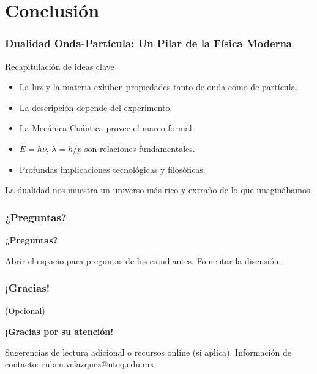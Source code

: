 \documentclass{beamer}
\begin{document}
	\section{Conclusión}
	
	\begin{frame}
		\frametitle{Dualidad Onda-Partícula: Un Pilar de la Física Moderna}
		\begin{block}{Recapitulación de ideas clave}
			\begin{itemize}
				\item La luz y la materia exhiben propiedades tanto de onda como de partícula.
				\item La descripción depende del experimento.
				\item La Mecánica Cuántica provee el marco formal.
				\item $E=h\nu$, $\lambda=h/p$ son relaciones fundamentales.
				\item Profundas implicaciones tecnológicas y filosóficas.
			\end{itemize}
		\end{block}
		\pause
		La dualidad nos muestra un universo más rico y extraño de lo que imaginábamos.
	\end{frame}
	
	\begin{frame}
		\frametitle{¿Preguntas?}
		\begin{center}
			\Huge \textbf{¿Preguntas?}
		\end{center}
		\vfill
		Abrir el espacio para preguntas de los estudiantes.
		\newline
		Fomentar la discusión.
	\end{frame}
	
	\begin{frame}
		\frametitle{¡Gracias!}
		(Opcional)
		\begin{center}
			\Huge \textbf{¡Gracias por su atención!}
		\end{center}
		\vfill
		Sugerencias de lectura adicional o recursos online (si aplica).
		\newline
		Información de contacto: ruben.velazquez@uteq.edu.mx
	\end{frame}
	
\end{document}
